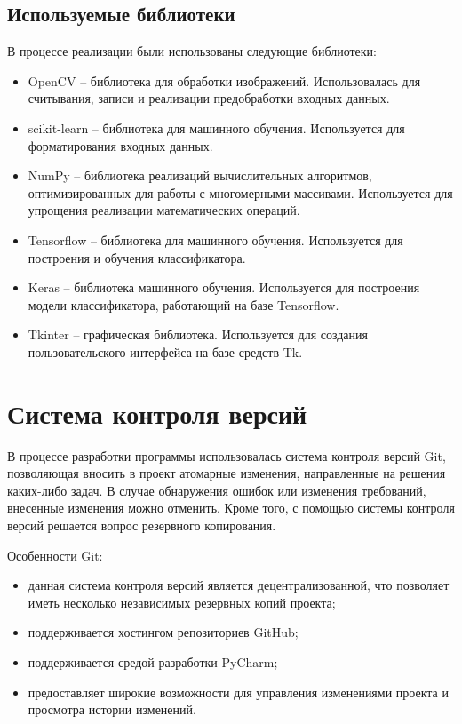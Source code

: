 \subsection{Используемые библиотеки}

В процессе реализации были использованы следующие библиотеки:

\begin{itemize}
	\item OpenCV\cite{opencv} -- библиотека для обработки изображений. Использовалась для считывания, записи и реализации предобработки входных данных.
	\item scikit-learn\cite{scikit} -- библиотека для машинного обучения. Используется для форматирования входных данных.
	\item NumPy\cite{numpy} -- библиотека реализаций вычислительных алгоритмов, оптимизированных для работы с многомерными массивами. Используется для упрощения реализации математических операций.
	\item Tensorflow\cite{tf} -- библиотека для машинного обучения. Используется для построения и обучения классификатора.
	\item Keras\cite{keras} -- библиотека машинного обучения. Используется для построения модели классификатора, работающий на базе Tensorflow.
	\item Tkinter -- графическая библиотека. Используется для создания пользовательского интерфейса на базе средств Tk.
\end{itemize}

\section{Система контроля версий}

В процессе разработки программы использовалась система контроля версий Git, позволяющая вносить в проект атомарные изменения, направленные на решения каких-либо задач. В случае обнаружения ошибок или изменения требований, внесенные изменения можно отменить. Кроме того, с помощью системы контроля версий решается вопрос резервного копирования.

Особенности Git:

\begin{itemize}
	\item данная система контроля версий является децентрализованной, что позволяет иметь несколько независимых резервных копий проекта;
	\item поддерживается хостингом репозиториев GitHub;
	\item поддерживается средой разработки PyCharm;
	\item предоставляет широкие возможности для управления изменениями проекта и просмотра истории изменений.
\end{itemize}

